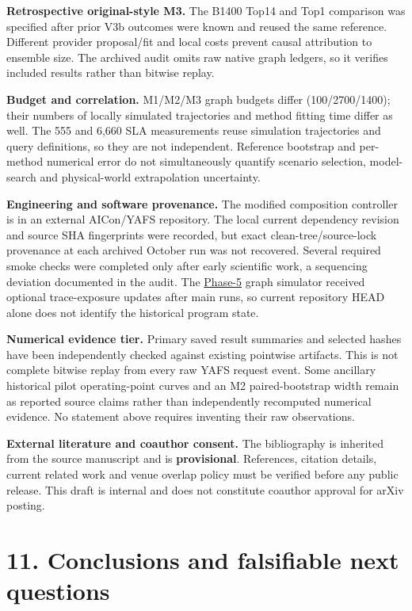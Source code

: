 \documentclass[10pt,a4paper]{article}
\begin{document}
\textbf{Retrospective original-style M3.} The B1400 Top14 and Top1 comparison was specified after prior V3b outcomes were known and reused the same reference. Different provider proposal/fit and local costs prevent causal attribution to ensemble size. The archived audit omits raw native graph ledgers, so it verifies included results rather than bitwise replay.

\textbf{Budget and correlation.} M1/M2/M3 graph budgets differ (100/2700/1400); their numbers of locally simulated trajectories and method fitting time differ as well. The 555 and 6,660 SLA measurements reuse simulation trajectories and query definitions, so they are not independent. Reference bootstrap and per-method numerical error do not simultaneously quantify scenario selection, model-search and physical-world extrapolation uncertainty.

\textbf{Engineering and software provenance.} The modified composition controller is in an external AICon/YAFS repository. The local current dependency revision and source SHA fingerprints were recorded, but exact clean-tree/source-lock provenance at each archived October run was not recovered. Several required smoke checks were completed only after early scientific work, a sequencing deviation documented in the audit. The \hyperref[app:experiment-stages]{Phase-5} graph simulator received optional trace-exposure updates after main runs, so current repository HEAD alone does not identify the historical program state.

\textbf{Numerical evidence tier.} Primary saved result summaries and selected hashes have been independently checked against existing pointwise artifacts. This is not complete bitwise replay from every raw YAFS request event. Some ancillary historical pilot operating-point curves and an M2 paired-bootstrap width remain as reported source claims rather than independently recomputed numerical evidence. No statement above requires inventing their raw observations.

\textbf{External literature and coauthor consent.} The bibliography is inherited from the source manuscript and is \textbf{provisional}. References, citation details, current related work and venue overlap policy must be verified before any public release. This draft is internal and does not constitute coauthor approval for arXiv posting.

\section*{11. Conclusions and falsifiable next questions}
\end{document}
